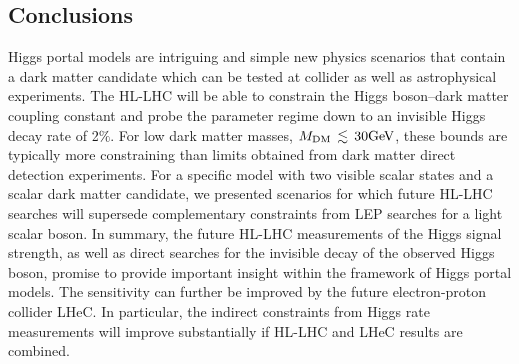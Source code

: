 \documentclass[../report.tex]{subfiles}
\begin{document}
\subsection{Conclusions}
\label{sec6:conclusions}

Higgs portal models are intriguing and simple new physics scenarios that contain a dark matter candidate which can be tested at collider as well as astrophysical experiments. The HL-LHC will be able to constrain the Higgs boson--dark matter coupling constant and probe the parameter regime down to an invisible Higgs decay rate of 2$\%$. For low dark matter masses, $M_\text{DM}\,\lesssim\,30\text{Ge\kern -0.1em V}$, these bounds are typically more constraining than limits obtained from dark matter direct detection experiments. For a specific model with two visible scalar states and a scalar dark matter candidate, we presented scenarios for which future HL-LHC {searches} will supersede complementary constraints from LEP searches for a light scalar boson. In summary, the future HL-LHC measurements of the Higgs signal strength, as well as {direct searches} for the invisible decay of the observed Higgs boson, promise to provide important insight within the framework of Higgs portal models. {The sensitivity can further be improved by the future electron-proton collider LHeC. In particular, the indirect constraints from Higgs rate measurements will improve substantially if HL-LHC and LHeC results are combined.}
\end{document}
